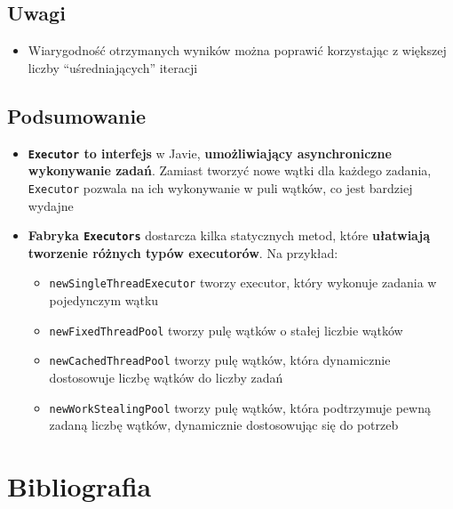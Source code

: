 \documentclass[11pt]{article}
\providecommand{\tightlist}{%
      \setlength{\itemsep}{0pt}\setlength{\parskip}{0pt}}
\begin{document}
    \hypertarget{uwagi}{%
\subsection{Uwagi}\label{uwagi}}

\begin{itemize}
\tightlist
\item
  Wiarygodność otrzymanych wyników można poprawić korzystając z większej
  liczby ``uśredniających'' iteracji
\end{itemize}

    \hypertarget{podsumowanie}{%
\subsection{Podsumowanie}\label{podsumowanie}}

\begin{itemize}
\item
  \textbf{\texttt{Executor} to interfejs} w Javie, \textbf{umożliwiający
  asynchroniczne wykonywanie zadań}. Zamiast tworzyć nowe wątki dla
  każdego zadania, \texttt{Executor} pozwala na ich wykonywanie w puli
  wątków, co jest bardziej wydajne
\item
  \textbf{Fabryka \texttt{Executors}} dostarcza kilka statycznych metod,
  które \textbf{ułatwiają tworzenie różnych typów executorów}. Na
  przykład:

  \begin{itemize}
  \tightlist
  \item
    \texttt{newSingleThreadExecutor} tworzy executor, który wykonuje
    zadania w pojedynczym wątku
  \item
    \texttt{newFixedThreadPool} tworzy pulę wątków o stałej liczbie
    wątków
  \item
    \texttt{newCachedThreadPool} tworzy pulę wątków, która dynamicznie
    dostosowuje liczbę wątków do liczby zadań
  \item
    \texttt{newWorkStealingPool} tworzy pulę wątków, która podtrzymuje
    pewną zadaną liczbę wątków, dynamicznie dostosowując się do potrzeb
  \end{itemize}
\end{itemize}

    \hypertarget{bibliografia}{%
\section{Bibliografia}\label{bibliografia}}
\end{document}
